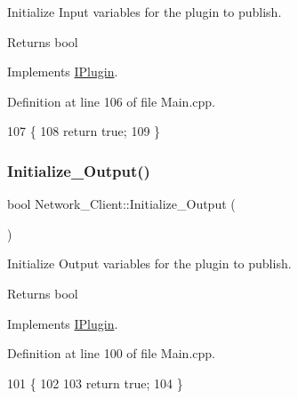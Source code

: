 Initialize Input variables for the plugin to publish. 

\begin{DoxyReturn}{Returns}
bool 
\end{DoxyReturn}


Implements \hyperlink{class_i_plugin_aa7c66743ad956d8ada57becee559af4d}{I\+Plugin}.



Definition at line 106 of file Main.\+cpp.


\begin{DoxyCode}
107 \{
108     \textcolor{keywordflow}{return} \textcolor{keyword}{true};
109 \}
\end{DoxyCode}
\mbox{\label{class_network___client_ae7279167c7343c8a8304f55a5f24c802}} 
\subsubsection{\texorpdfstring{Initialize\+\_\+\+Output()}{Initialize\_Output()}}
{\footnotesize\ttfamily bool Network\+\_\+\+Client\+::\+Initialize\+\_\+\+Output (\begin{DoxyParamCaption}{ }\end{DoxyParamCaption})\hspace{0.3cm}{\ttfamily [virtual]}}



Initialize Output variables for the plugin to publish. 

\begin{DoxyReturn}{Returns}
bool 
\end{DoxyReturn}


Implements \hyperlink{class_i_plugin_a0b772513fc8c4ed01240e19c4bb84068}{I\+Plugin}.



Definition at line 100 of file Main.\+cpp.


\begin{DoxyCode}
101 \{
102 
103     \textcolor{keywordflow}{return} \textcolor{keyword}{true};
104 \}
\end{DoxyCode}
\mbox{\label{class_network___client_a02e30223901e61514ee59eccec70dddf}} 

